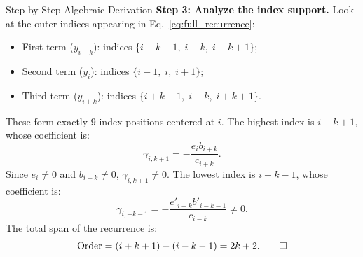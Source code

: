 \documentclass[11pt]{article}
\begin{document}
\begin{defbox}{Step-by-Step Algebraic Derivation}
\noindent\textbf{Step 3: Analyze the index support.}
Look at the outer indices appearing in Eq.~\eqref{eq:full_recurrence}:
\begin{itemize}[leftmargin=*,nosep]
  \item First term ($y_{i-k}$): indices $\{ i-k-1, \; i-k, \; i-k+1 \}$;
  \item Second term ($y_i$): indices $\{ i-1, \; i, \; i+1 \}$;
  \item Third term ($y_{i+k}$): indices $\{ i+k-1, \; i+k, \; i+k+1 \}$.
\end{itemize}
These form exactly 9 index positions centered at $i$.
The highest index is $i + k + 1$, whose coefficient is:
\begin{equation}
  \gamma_{i, k+1} = -\frac{e_i b_{i+k}}{c_{i+k}}.
\end{equation}
Since $e_i \ne 0$ and $b_{i+k} \ne 0$, $\gamma_{i, k+1} \ne 0$.
The lowest index is $i - k - 1$, whose coefficient is:
\begin{equation}
  \gamma_{i, -k-1} = -\frac{e'_{i-k} b'_{i-k-1}}{c_{i-k}} \ne 0.
\end{equation}
The total span of the recurrence is:
\begin{equation}
  \text{Order} = (i + k + 1) - (i - k - 1) = 2k + 2. \qedhere
\end{equation}
\end{defbox}
\end{document}
